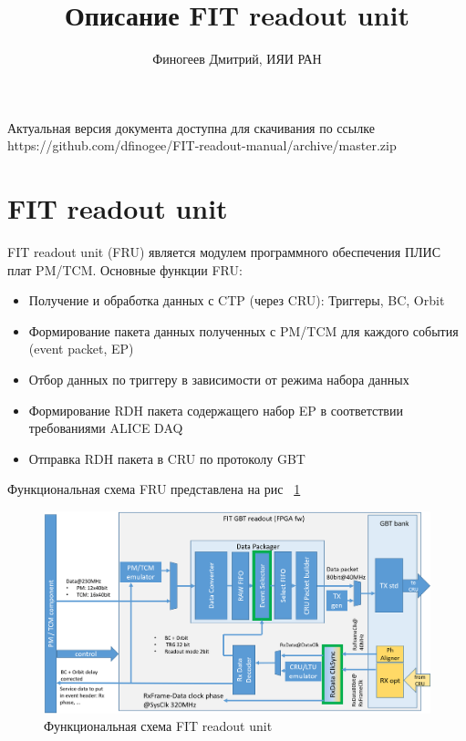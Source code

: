 \documentclass{article}
\title{Описание FIT readout unit}
\author{Финогеев Дмитрий, ИЯИ РАН}
\begin{document}
\maketitle

Актуальная версия документа доступна для скачивания по ссылке
\newline
https://github.com/dfinogee/FIT-readout-manual/archive/master.zip



\tableofcontents
\newpage

\section{FIT readout unit}
FIT readout unit (FRU) является модулем программного обеспечения ПЛИС плат PM/TCM. Основные функции FRU:

\begin{itemize}
\item Получение и обработка данных с CTP (через CRU): Триггеры, BC, Orbit 
\item Формирование пакета данных полученных с PM/TCM для каждого события (event packet, EP)
\item Отбор данных по триггеру в зависимости от режима набора данных
\item Формирование RDH пакета содержащего набор EP в соответствии требованиями ALICE DAQ 
\item Отправка RDH пакета в CRU по протоколу GBT
\end{itemize}


Функциональная схема FRU представлена на рис ~\ref{fig:2}
\begin{figure}[H]
	\centering 
	\includegraphics[width=1\textwidth]{FIT_readout.png}
	\caption{\label{fig:2} Функциональная схема FIT readout unit}
\end{figure}
\end{document}
